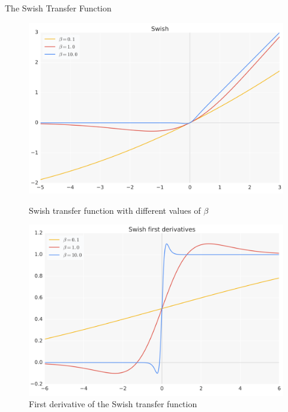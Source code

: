 \begin{frame}{The Swish Transfer Function \cite{Ramachandran2017}}
    \begin{figure}[ht]
        \begin{minipage}[b]{0.45\linewidth}
            \centering
            \includegraphics[width=\textwidth]{figures/ff/swish.png}
            \caption{Swish transfer function with different values of $\beta$}
        \end{minipage}
        \hspace{0.2cm}
        \begin{minipage}[b]{0.45\linewidth}
            \centering
            \includegraphics[width=\textwidth]{figures/ff/swishderivative.png}
            \caption{First derivative of the Swish transfer function}
        \end{minipage}
    \end{figure}
\end{frame}

